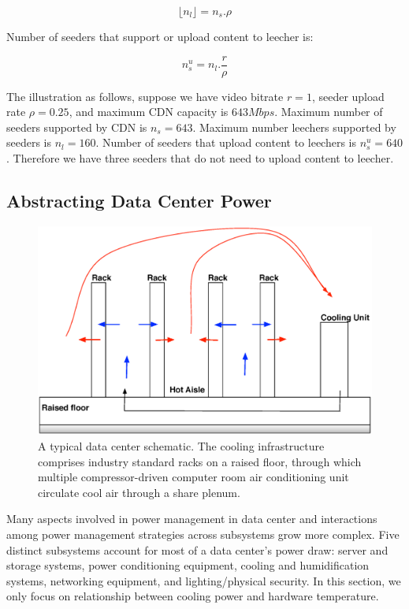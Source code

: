 \documentclass[JIP]{ipsj}
\begin{document}
\begin{equation}\label{eqn:leecher}
	\lfloor n_l \rfloor = n_s . \rho
\end{equation}

Number of seeders that support or upload content to leecher is:

\begin{equation}\label{eqn:seeders-to-leechers}
	n_{s}^{u} = n_l . \frac{r}{\rho}
\end{equation}

The illustration as follows, suppose we have video bitrate $r=1$, seeder upload rate $\rho=0.25$, and maximum CDN capacity is $643Mbps$. 
Maximum number of seeders supported by CDN is $n_s=643$.
Maximum number leechers supported by seeders is $n_l=160$.  
Number of seeders that upload content to leechers is $n_{s}^{u}=640$.  
Therefore we have three seeders that do not need to upload content to leecher. 


\subsection{Abstracting Data Center Power}\label{thermodynamics}
\begin{figure}[thb]
\begin{center}
\includegraphics[scale=0.3]{graphs/datacenter.eps}
\end{center}
\caption{A typical data center schematic.
The cooling infrastructure comprises industry standard racks on a raised floor, through which multiple compressor-driven computer room air conditioning unit circulate cool air through a share plenum.}
\label{fig:datacenter}
\vspace{-2mm}
\end{figure} 
Many aspects involved in power management in data center and interactions among power management strategies across subsystems grow more complex.
Five distinct subsystems account for most of a data center's power draw:   server and storage systems, power conditioning equipment, cooling and humidification systems, networking equipment, and lighting/physical security.
In this section, we only focus on relationship between cooling power and hardware temperature.
\end{document}
